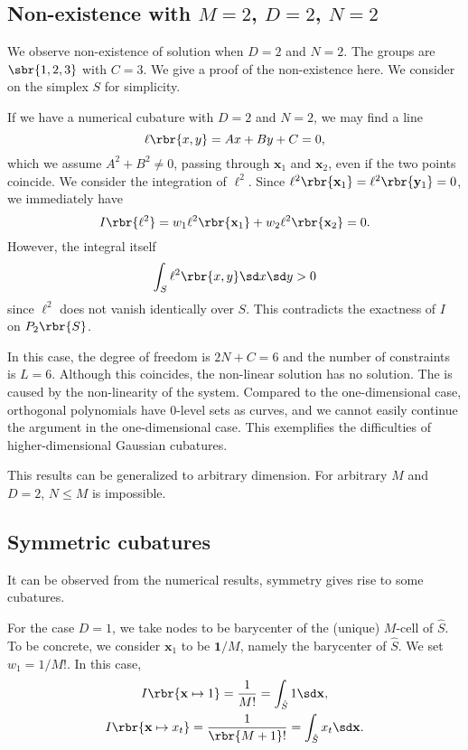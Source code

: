 \documentclass[english, nochinese]{pnote}
\begin{document}
\subsection{Non-existence with $ M = 2 $, $ D = 2 $, $ N = 2 $}

We observe non-existence of solution when $ D = 2 $ and $ N = 2 $. The groups are $ \sbr{ 1, 2, 3 } $ with $ C = 3 $. We give a proof of the non-existence here. We consider on the simplex $S$ for simplicity.

If we have a numerical cubature with $ D = 2 $ and $ N = 2 $, we may find a line
\begin{equation}
\ell \rbr{ x, y } = A x + B y + C = 0,
\end{equation}
which we assume $ A^2 + B^2 \neq 0 $, passing through $\mathbf{x}_1$ and $\mathbf{x}_2$, even if the two points coincide. We consider the integration of $\ell^2$. Since $ \ell^2 \rbr{\mathbf{x}_1} = \ell^2 \rbr{\mathbf{y}_1} = 0 $, we immediately have
\begin{equation}
I \rbr{\ell^2} = w_1 \ell^2 \rbr{\mathbf{x}_1} + w_2 \ell^2 \rbr{\mathbf{x}_2} = 0.
\end{equation}
However, the integral itself
\begin{equation}
\int_S \ell^2 \rbr{ x, y } \sd x \sd y > 0
\end{equation}
since $\ell^2$ does not vanish identically over $S$. This contradicts the exactness of $I$ on $ P_2 \rbr{S} $.

In this case, the degree of freedom is $ 2 N + C = 6 $ and the number of constraints is $ L = 6 $. Although this coincides, the non-linear solution has no solution. The is caused by the non-linearity of the system. Compared to the one-dimensional case, orthogonal polynomials have $0$-level sets as curves, and we cannot easily continue the argument in the one-dimensional case. This exemplifies the difficulties of higher-dimensional Gaussian cubatures.

This results can be generalized to arbitrary dimension. For arbitrary $M$ and $ D = 2 $, $ N \le M $ is impossible.

\subsection{Symmetric cubatures}

It can be observed from the numerical results, symmetry gives rise to some cubatures.

For the case $ D = 1 $, we take nodes to be barycenter of the (unique) $M$-cell of $\hat{S}$. To be concrete, we consider $\mathbf{x}_1$ to be $ \mathbf{1} / M $, namely the barycenter of $\hat{S}$. We set $ w_1 = 1 / M ! $. In this case,
\begin{gather}
I \rbr{ \mathbf{x} \mapsto 1 } = \frac{1}{ M ! } = \int_{\hat{S}} 1 \sd \mathbf{x}, \\
I \rbr{ \mathbf{x} \mapsto x_t } = \frac{1}{ \rbr{ M + 1 } ! } = \int_{\hat{S}} x_t \sd \mathbf{x}.
\end{gather}
\end{document}
